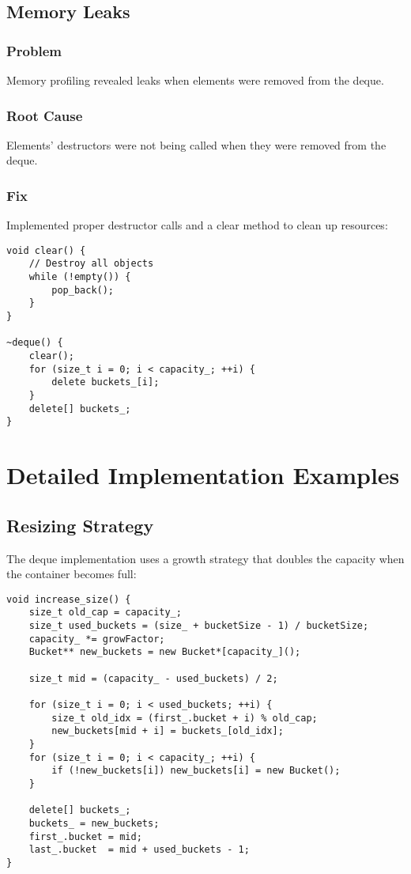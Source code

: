 \documentclass[a4paper,12pt]{article}
\begin{document}
\subsection{Memory Leaks}
\subsubsection{Problem}
Memory profiling revealed leaks when elements were removed from the deque.

\subsubsection{Root Cause}
Elements' destructors were not being called when they were removed from the deque.

\subsubsection{Fix}
Implemented proper destructor calls and a clear method to clean up resources:

\begin{lstlisting}
void clear() {
    // Destroy all objects
    while (!empty()) {
        pop_back();
    }
}

~deque() {
    clear();
    for (size_t i = 0; i < capacity_; ++i) {
        delete buckets_[i];
    }
    delete[] buckets_;
}
\end{lstlisting}

\section{Detailed Implementation Examples}

\subsection{Resizing Strategy}
The deque implementation uses a growth strategy that doubles the capacity when the container becomes full:

\begin{lstlisting}
void increase_size() {
    size_t old_cap = capacity_;
    size_t used_buckets = (size_ + bucketSize - 1) / bucketSize;
    capacity_ *= growFactor;
    Bucket** new_buckets = new Bucket*[capacity_]();

    size_t mid = (capacity_ - used_buckets) / 2;

    for (size_t i = 0; i < used_buckets; ++i) {
        size_t old_idx = (first_.bucket + i) % old_cap;
        new_buckets[mid + i] = buckets_[old_idx];
    }
    for (size_t i = 0; i < capacity_; ++i) {
        if (!new_buckets[i]) new_buckets[i] = new Bucket();
    }

    delete[] buckets_;
    buckets_ = new_buckets;
    first_.bucket = mid;
    last_.bucket  = mid + used_buckets - 1;
}
\end{lstlisting}
\end{document}

